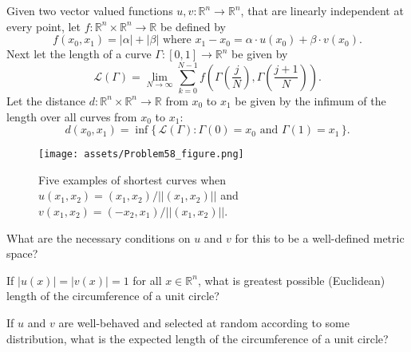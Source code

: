 \documentclass{article}
\begin{document}
Given two vector valued functions
$u, v\colon \mathbb{R}^n \rightarrow \mathbb{R}^n$, that are linearly
independent at every point, let
$f\colon \mathbb{R}^n \times \mathbb{R}^n \rightarrow \mathbb{R}$ be
defined by \[
  f(x_0, x_1) = |\alpha| + |\beta| \text{ where }
  x_1 - x_0 = \alpha \cdot u(x_0) + \beta \cdot v(x_0).
\]
Next let the length of a curve $\Gamma\colon [0, 1] \rightarrow \mathbb{R}^n$
be given by \[
  \mathcal{L}(\Gamma) = \lim_{N \rightarrow \infty} \sum_{k = 0}^{N - 1} f\left(
    \Gamma\left(\frac{j}{N}\right), \Gamma\left(\frac{j + 1}{N}\right)
  \right).
\]
Let the distance $d: \mathbb{R}^n \times \mathbb{R}^n \rightarrow \mathbb{R}$
from $x_0$ to $x_1$ be given by the infimum of the length over all curves from
$x_0$ to $x_1$: \[
  d(x_0, x_1) = \inf\{\,\mathcal{L}(\Gamma): \Gamma(0) = x_0 \text{ and } \Gamma(1) = x_1\,\}.
\]
\begin{figure}[ht!]
  \centering
  \texttt{[image: assets/Problem58\_figure.png]}
  \caption{
    Five examples of shortest curves when
    $u(x_1, x_2) = (x_1, x_2)/||(x_1, x_2)||$ and
    $v(x_1, x_2) = (-x_2, x_1)/||(x_1, x_2)||$.
  }
\end{figure}
\begin{question}
  What are the necessary conditions on $u$ and $v$ for this to be a well-defined
  metric space?
\end{question}
\begin{related}
  \item If $|u(x)| = |v(x)| = 1$ for all $x \in \mathbb{R}^n$, what is greatest
    possible (Euclidean) length of the circumference of a unit circle?
  \item If $u$ and $v$ are well-behaved and selected at random according to some
    distribution, what is the expected length of the circumference of a unit
    circle?
\end{related}
\end{document}

